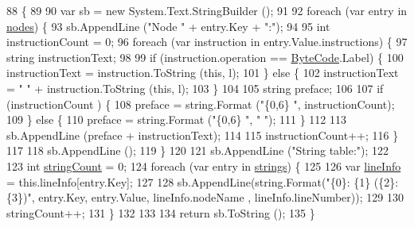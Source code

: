 \begin{DoxyCode}
88                                           \{
89 
90             var sb = \textcolor{keyword}{new} System.Text.StringBuilder ();
91 
92             \textcolor{keywordflow}{foreach} (var entry \textcolor{keywordflow}{in} \hyperlink{a00126_a3f4928a577c88263ad016be259b175c4}{nodes}) \{
93                 sb.AppendLine (\textcolor{stringliteral}{"Node "} + entry.Key + \textcolor{stringliteral}{":"});
94 
95                 \textcolor{keywordtype}{int} instructionCount = 0;
96                 \textcolor{keywordflow}{foreach} (var instruction \textcolor{keywordflow}{in} entry.Value.instructions) \{
97                     \textcolor{keywordtype}{string} instructionText;
98 
99                     \textcolor{keywordflow}{if} (instruction.operation == \hyperlink{a00031_ad5dfb6ee68ca7469623ad3e459f98894}{ByteCode}.Label) \{
100                         instructionText = instruction.ToString (\textcolor{keyword}{this}, l);
101                     \} \textcolor{keywordflow}{else} \{
102                         instructionText = \textcolor{stringliteral}{"    "} + instruction.ToString (\textcolor{keyword}{this}, l);
103                     \}
104 
105                     \textcolor{keywordtype}{string} preface;
106 
107                     \textcolor{keywordflow}{if} (instructionCount %
      ) \{
108                         preface = string.Format (\textcolor{stringliteral}{"\{0,6\}   "}, instructionCount);
109                     \} \textcolor{keywordflow}{else} \{
110                         preface = string.Format (\textcolor{stringliteral}{"\{0,6\}   "}, \textcolor{stringliteral}{" "});
111                     \}
112 
113                     sb.AppendLine (preface + instructionText);
114 
115                     instructionCount++;
116                 \}
117 
118                 sb.AppendLine ();
119             \}
120 
121             sb.AppendLine (\textcolor{stringliteral}{"String table:"});
122 
123             \textcolor{keywordtype}{int} \hyperlink{a00126_a8ef1d10094ef00311aade6715ba78ec7}{stringCount} = 0;
124             \textcolor{keywordflow}{foreach} (var entry \textcolor{keywordflow}{in} \hyperlink{a00126_a91518fda7e41bf573f66c6946dd3b4cb}{strings}) \{
125 
126                 var \hyperlink{a00126_a0d4da395947767b4a1eaaff8a9842adc}{lineInfo} = this.lineInfo[entry.Key];
127 
128                 sb.AppendLine(string.Format(\textcolor{stringliteral}{"\{0\}: \{1\} (\{2\}:\{3\})"}, entry.Key, entry.Value, lineInfo.nodeName
      , lineInfo.lineNumber));
129 
130                 stringCount++;
131             \}
132 
133 
134             \textcolor{keywordflow}{return} sb.ToString ();
135         \}
\end{DoxyCode}
